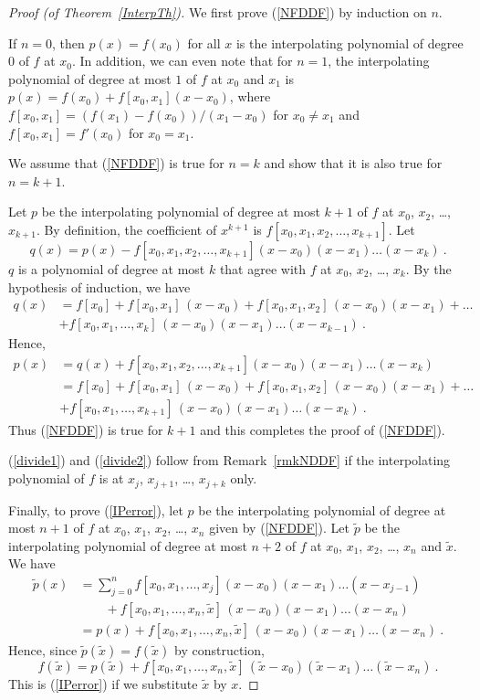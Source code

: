 \begin{proof}[Proof (of Theorem~\ref{InterpTh})]
We first prove (\ref{NFDDF}) by induction on $n$.

If $n=0$, then $p(x) = f(x_0)$ for all $x$ is the interpolating
polynomial of degree $0$ of $f$ at $x_0$.  In addition, we can even
note that for $n=1$, the interpolating polynomial of degree at
most $1$ of $f$ at $x_0$ and $x_1$ is
$p(x) = f(x_0) + f[x_0,x_1](x-x_0)$, where
$f[x_0,x_1] = (f(x_1)-f(x_0))/(x_1-x_0)$ for $x_0 \neq x_1$ and
$f[x_0,x_1] = f'(x_0)$ for $x_0 = x_1$.

We assume that (\ref{NFDDF}) is true for $n=k$ and show that it is
also true for $n=k+1$.

Let $p$ be the interpolating polynomial of degree at most $k+1$ of $f$
at $x_0$, $x_2$, \ldots, $x_{k+1}$.  By definition, the coefficient of
$x^{k+1}$ is $f[x_0, x_1, x_2, \ldots, x_{k+1}]$.  Let
\[
q(x) = p(x) - f[x_0, x_1, x_2, \ldots, x_{k+1}]
(x-x_0)(x-x_1) \ldots (x-x_k) \ .
\]
$q$ is a polynomial of degree at most $k$ that agree with $f$ at
$x_0$, $x_2$, \ldots, $x_k$.
By the hypothesis of induction, we have
\begin{align*}
q(x) &= f[x_0]+f[x_0,x_1]\,(x-x_0) +
f[x_0,x_1,x_2]\,(x-x_0)(x-x_1) + \ldots \\
 &+f[x_0,x_1,\ldots,x_k]\,(x-x_0)(x-x_1)\ldots(x-x_{k-1}) \ .
\end{align*}
Hence,
\begin{align*}
p(x) &= q(x) + f[x_0, x_1, x_2, \ldots, x_{k+1}]
(x-x_0)(x-x_1) \ldots (x-x_k) \\
&= f[x_0]+f[x_0,x_1]\,(x-x_0) +
f[x_0,x_1,x_2]\,(x-x_0)(x-x_1) + \ldots \\
&+f[x_0,x_1,\ldots,x_{k+1}]\,(x-x_0)(x-x_1)\ldots(x-x_k) \ .
\end{align*}
Thus (\ref{NFDDF}) is true for $k+1$ and this completes the proof of
(\ref{NFDDF}).

(\ref{divide1}) and (\ref{divide2}) follow from 
Remark~\ref{rmkNDDF} if the interpolating polynomial of $f$ is at $x_j$,
$x_{j+1}$, \ldots, $x_{j+k}$ only.

Finally, to prove (\ref{IPerror}), let $p$ be the interpolating
polynomial of degree at most $n+1$ of $f$ at $x_0$, $x_1$, $x_2$,
\ldots, $x_n$ given by (\ref{NFDDF}).  Let $\tilde{p}$ be the
interpolating polynomial of degree at most $n+2$ of $f$ at $x_0$,
$x_1$, $x_2$, \ldots, $x_n$ and $\tilde{x}$.  We have
\begin{align*}
\tilde{p}(x) &= \sum_{j=0}^n f[x_0, x_1, \ldots, x_j]
(x-x_0)(x-x_1)\ldots(x-x_{j-1}) \\
&\qquad+ f[x_0,x_1,\dots,x_n,\tilde{x}]\,(x-x_0)(x-x_1)\ldots(x-x_n) \\
&= p(x) + f[x_0,x_1,\dots,x_n,\tilde{x}]\,(x-x_0)(x-x_1)\ldots(x-x_n) \ .
\end{align*}
Hence, since $\tilde{p}(\tilde{x}) = f(\tilde{x})$ by construction,
\[
f(\tilde{x})
= p(\tilde{x}) + f[x_0,x_1,\ldots,x_n,\tilde{x}]\,
(\tilde{x}-x_0)(\tilde{x}-x_1)\ldots(\tilde{x}-x_n) \ .
\]
This is (\ref{IPerror}) if we substitute $\tilde{x}$ by $x$.
\end{proof}

